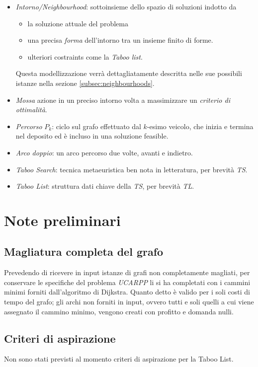 \begin{itemize}
	  \item \emph{Intorno/Neighbourhood}: sottoinsieme dello spazio di
	  	soluzioni indotto da
	  		\begin{itemize}
	  		  \item la soluzione attuale del problema
	  		  \item una precisa \emph{forma} dell'intorno tra un insieme finito di forme.
	  		  \item ulteriori costraints come la \emph{Taboo list}.
	  		\end{itemize}
	  		Questa modellizzazione verrà dettagliatamente descritta nelle sue
	  		possibili istanze nella sezione \ref{subsec:neighbourhoods}.
	  \item \emph{Mossa} azione in un preciso intorno volta a massimizzare un \emph{criterio di ottimalità}.
	  \item \emph{Percorso} $P_k$: ciclo sul grafo effettuato dal $k$-esimo
	  veicolo, che inizia e termina nel deposito ed è incluso in una soluzione feasible.
	  \item \emph{Arco doppio}: un arco percorso due volte, avanti e indietro.
	  \item \emph{Taboo Search}: tecnica metaeuristica ben nota in letteratura, per
	  brevità \emph{TS}.
	  \item \emph{Taboo List}: struttura dati chiave della \emph{TS}, per brevità
	  \emph{TL}.
	\end{itemize}
	
\section{Note preliminari}
\subsection{Magliatura completa del grafo} %
	Prevedendo di ricevere in input istanze di grafi non completamente magliati, per conservare le specifiche del problema \emph{UCARPP} li
	si ha completati con i cammini minimi forniti dall'algoritmo di Dijkstra. Quanto detto è valido per i soli costi di tempo del grafo;
	gli archi non forniti in input, ovvero tutti e soli quelli a cui viene assegnato il cammino minimo, vengono creati con profitto e domanda nulli.
\subsection{Criteri di aspirazione} %
Non sono stati previsti al momento criteri di aspirazione per la Taboo List.	
	
